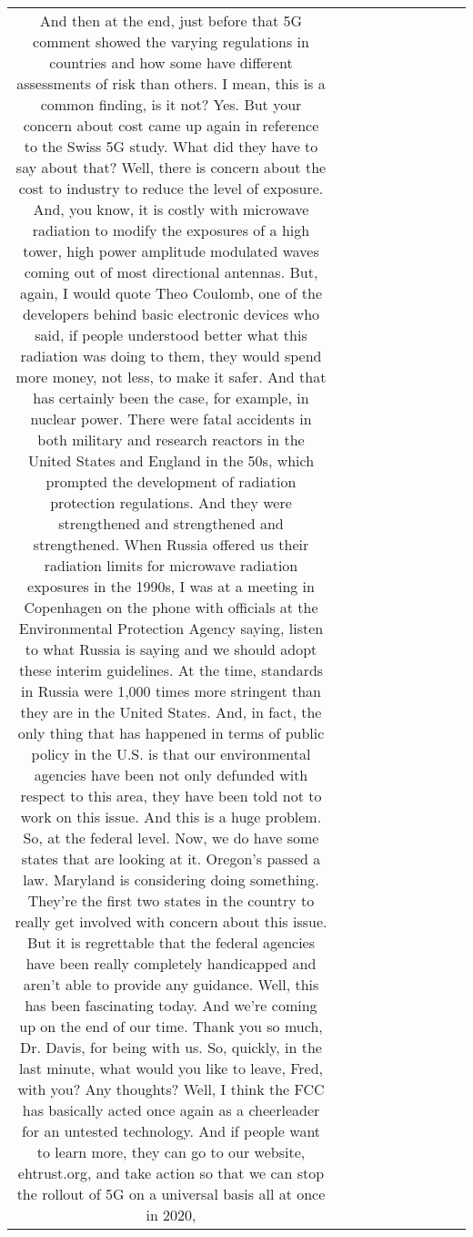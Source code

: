 \begin{table}[h!]
\begin{tabular}{|c|c|c|c|c|c|c|c|c|c|}
And then at the end, just before that 5G comment showed the varying regulations in countries and how some have different assessments of risk than others.
I mean, this is a common finding, is it not?
Yes.
But your concern about cost came up again in reference to the Swiss 5G study.
What did they have to say about that?
Well, there is concern about the cost to industry to reduce the level of exposure.
And, you know, it is costly with microwave radiation to modify the exposures of a high tower, high power amplitude modulated waves coming out of most directional antennas.
But, again, I would quote Theo Coulomb, one of the developers behind basic electronic devices who said,
if people understood better what this radiation was doing to them, they would spend more money, not less, to make it safer.
And that has certainly been the case, for example, in nuclear power.
There were fatal accidents in both military and research reactors in the United States and England in the 50s,
which prompted the development of radiation protection regulations.
And they were strengthened and strengthened and strengthened.
When Russia offered us their radiation limits for microwave radiation exposures in the 1990s,
I was at a meeting in Copenhagen on the phone with officials at the Environmental Protection Agency saying,
listen to what Russia is saying and we should adopt these interim guidelines.
At the time, standards in Russia were 1,000 times more stringent than they are in the United States.
And, in fact, the only thing that has happened in terms of public policy in the U.S.
is that our environmental agencies have been not only defunded with respect to this area,
they have been told not to work on this issue.
And this is a huge problem.
So, at the federal level.
Now, we do have some states that are looking at it.
Oregon's passed a law.
Maryland is considering doing something.
They're the first two states in the country to really get involved with concern about this issue.
But it is regrettable that the federal agencies have been really completely handicapped
and aren't able to provide any guidance.
Well, this has been fascinating today.
And we're coming up on the end of our time.
Thank you so much, Dr. Davis, for being with us.
So, quickly, in the last minute, what would you like to leave, Fred, with you?
Any thoughts?
Well, I think the FCC has basically acted once again as a cheerleader for an untested technology.
And if people want to learn more, they can go to our website, ehtrust.org,
and take action so that we can stop the rollout of 5G on a universal basis all at once in 2020,

\end{tabular}
\end{table}
